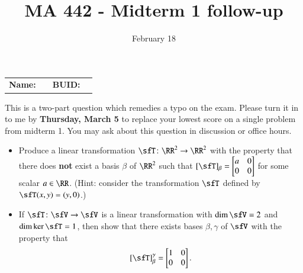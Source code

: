\documentclass[12pt]{article}
\title{MA 442 - Midterm 1 follow-up}
\date{February 18}
\begin{document}
\maketitle
\vspace{-1em}
\noindent
\begin{tabular}{@{}p{1cm}p{8cm}p{1cm}p{5cm}@{}}
\textbf{Name:} & \hrulefill & \textbf{BUID:} & \hrulefill \\
\end{tabular}

\vspace{4pt}

This is a two-part question which remedies a typo on the exam. Please turn it in to me by \textbf{Thursday, March 5} to replace your lowest score on a
single problem from midterm 1.
You may ask about this question in discussion or office hours.

\begin{question}
  \begin{itemize}
    \item[(a)] Produce a linear transformation $\sfT \colon \RR^2 \to \RR^2$ with the property that there does \textbf{not} exist a basis
  $\beta$ of $\RR^2$ such that $[\sfT]_\beta = \begin{bmatrix} a & 0 \\ 0 & 0 \end{bmatrix}$ for some scalar $a \in
  \RR$. (Hint: consider the transformation $\sfT$ defined by $\sfT(x,y) = (y,0)$.)
    \item[(b)] If $\sfT \colon \sfV \to \sfV$ is a linear transformation with $\dim \sfV = 2$ and $\dim \ker \sfT = 1$,
      then show that there exists bases $\beta,\gamma$ of $\sfV$ with the property that 
      \begin{equation}\label{}
        [\sfT]_\beta^\gamma = \begin{bmatrix} 1 & 0 \\ 0 & 0 \end{bmatrix} .
      \end{equation}
\end{itemize}
\end{question}

\vspace{4pt} 
\end{document}

